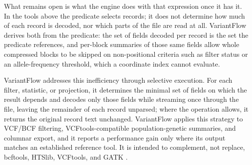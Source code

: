 What remains open is what the engine does with that expression once it has it.
In the tools above the predicate selects records; it does not determine how much
of each record is decoded, nor which parts of the file are read at all.
VariantFlow derives both from the predicate: the set of fields decoded per record
is the set the predicate references, and per-block summaries of those same fields
allow whole compressed blocks to be skipped on non-positional criteria such as
filter status or an allele-frequency threshold, which a coordinate index cannot
evaluate.

VariantFlow addresses this inefficiency through selective execution. For each
filter, statistic, or projection, it determines the minimal set of fields on
which the result depends and decodes only those fields while streaming once
through the file, leaving the remainder of each record unparsed; where the
operation allows, it returns the original record text unchanged. VariantFlow
applies this strategy to VCF/BCF filtering, VCFtools-compatible
population-genetic summaries, and columnar export, and it reports a performance
gain only where its output matches an established reference tool. It is intended
to complement, not replace, bcftools, HTSlib, VCFtools, and GATK \citep{gatk}.
